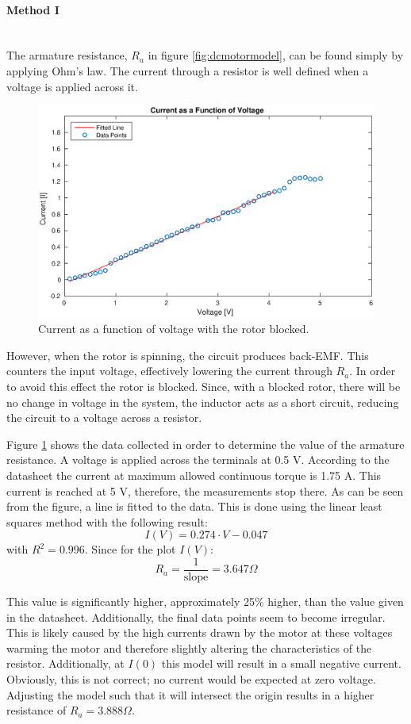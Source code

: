 \paragraph{Method I}~\\
The armature resistance, $R_a$ in figure \ref{fig:dcmotormodel}, can be found simply by applying Ohm's law.
The current through a resistor is well defined when a voltage is applied across it.

\begin{figure}[!h]
	\centering
	\includegraphics[width=.75\linewidth]{graphics/raplot}
	\caption{Current as a function of voltage with the rotor blocked.}
	\label{fig:raplot}
\end{figure}

However, when the rotor is spinning, the circuit produces back-EMF.
This counters the input voltage, effectively lowering the current through $R_a$.
In order to avoid this effect the rotor is blocked.
Since, with a blocked rotor, there will be no change in voltage in the system, the inductor acts as a short circuit, reducing the circuit to a voltage across a resistor. 

Figure \ref{fig:raplot} shows the data collected in order to determine the value of the armature resistance.
A voltage is applied across the terminals at 0.5 V.
According to the datasheet \cite{pittmann} the current at maximum allowed continuous torque is 1.75 A.
This current is reached at 5 V, therefore, the measurements stop there.
As can be seen from the figure, a line is fitted to the data.
This is done using the linear least squares method with the following result:
$$I(V)=0.274\cdot V-0.047$$
with $R^2=0.996$.
Since for the plot $I(V)$:
$$R_a = \frac{1}{\text{slope}} = 3.647\Omega$$

This value is significantly higher, approximately 25\% higher, than the value given in the datasheet.
Additionally, the final data points seem to become irregular.
This is likely caused by the high currents drawn by the motor at these voltages warming the motor and therefore slightly altering the characteristics of the resistor.
Additionally, at $I(0)$ this model will result in a small negative current.
Obviously, this is not correct; no current would be expected at zero voltage.
Adjusting the model such that it will intersect the origin results in a higher resistance of $R_a=3.888\Omega$.

